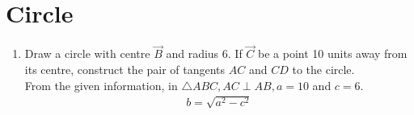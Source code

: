 \documentclass[journal,12pt,twocolumn]{IEEEtran}
\renewcommand\thesection{\arabic{section}}
\begin{document}
\section{Circle}
\begin{enumerate}[label=\thesection.\arabic*
,ref=\thesection.\theenumi]
\item Draw a circle with centre $\vec{B}$ and radius 6.  If $\vec{C}$ be  a point 10 units  away from its 
centre, construct the pair of tangents $AC$ and $CD$ to the 
circle.
\\
\solution From the given information, in $\triangle ABC, AC \perp AB, a = 
10$ and $c = 6$.
\begin{align}
b =  \sqrt{a^2-c^2}
\end{align}
%

%
%
%
%


\end{enumerate}
\end{document}
